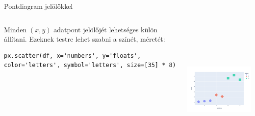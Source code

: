 \documentclass[english, aspectratio=169]{beamer}
\begin{document}
\begin{frame}[fragile]{Pontdiagram jelölőkkel}
	\begin{columns}
		\begin{column}{.5\textwidth}
			Minden $\left(x,y\right)$ adatpont jelölőjét lehetséges külön állítani. Ezeknek testre lehet szabni a színét, méretét:
			\vspace{0.3cm}
			\begin{lstlisting}
px.scatter(df, x='numbers', y='floats', color='letters', symbol='letters', size=[35] * 8)			
			\end{lstlisting}
		\end{column}
		\begin{column}{.5\textwidth}
			\begin{center}
				\includegraphics[width=7cm, height=7cm, keepaspectratio]{images/plots_10.png}
			\end{center}
		\end{column}
	\end{columns}
\end{frame}
\end{document}
